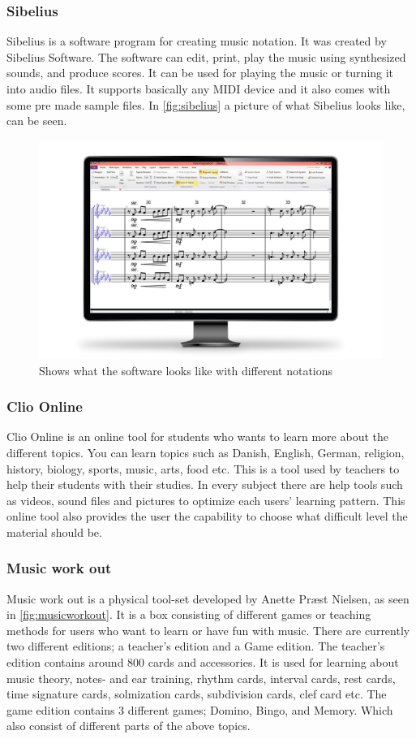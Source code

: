 \subsubsection{Sibelius}
Sibelius is a software program for creating music notation. It was created by Sibelius Software. The software can edit, print, play the music using synthesized sounds, and produce scores. It can be used for playing the music or turning it into audio files. It supports basically any MIDI device and it also comes with some pre made sample files. In \autoref{fig:sibelius} a picture of what Sibelius looks like, can be seen. 

\begin{figure}[H]
	\centering
	\includegraphics[width=0.7\linewidth]{figure/Analysis/Sibelius}
	\caption{Shows what the software looks like with different notations}
	\label{fig:sibelius}
\end{figure}

\subsubsection{Clio Online} 
Clio Online is an online tool for students who wants to learn more about the different topics. You can learn topics such as Danish, English, German, religion, history, biology, sports, music, arts, food etc. This is a tool used by teachers to help their students with their studies. In every subject there are help tools such as videos, sound files and pictures to optimize each users' learning pattern. This online tool also provides the user the capability to choose what difficult level the material should be.

\subsubsection{Music work out}
Music work out is a physical tool-set developed by Anette Præst Nielsen, as seen in \autoref{fig:musicworkout}. It is a box consisting of different games or teaching methods for users who want to learn or have fun with music. There are currently two different editions; a teacher’s edition and a Game edition. The teacher’s edition contains around 800 cards and accessories. It is used for learning about music theory, notes- and ear training, rhythm cards, interval cards, rest cards, time signature cards, solmization cards, subdivision cards, clef card etc. The game edition contains 3 different games; Domino, Bingo, and Memory. Which also consist of different parts of the above topics.

